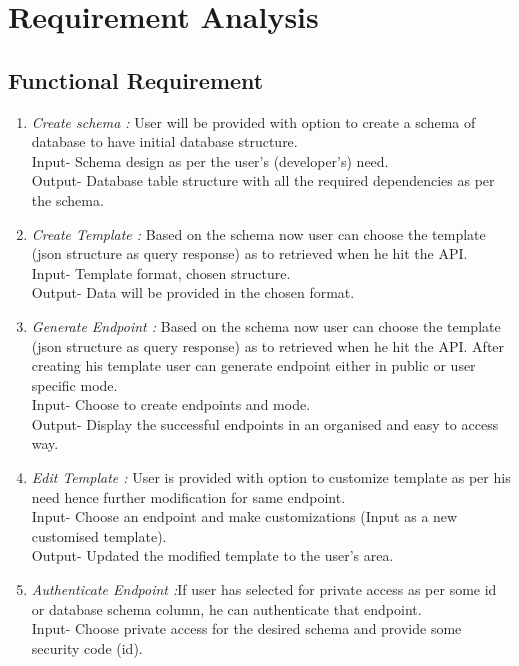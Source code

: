 \documentclass[a4paper,12pt]{report}
\begin{document}
    \vfill

    \section{Requirement Analysis}    
    \subsection{Functional Requirement}
    \begin{enumerate}
      \item {\emph {Create schema :} User will be provided with option to create a schema of database to have initial database structure. \\
      Input- Schema design as per the user’s (developer’s) need.  \\
      Output- Database table structure with all the required dependencies as per the schema.}
      \item {\emph {Create Template :} Based on the schema now user can choose the template (json structure as query response) as to retrieved when he hit the API. \\
        Input- Template format, chosen structure. \\
        Output- Data will be provided in the chosen format.
      }
      \item {\emph {Generate Endpoint :} Based on the schema now user can choose the template (json structure as query response) as to retrieved when he hit the API. After creating his template user can generate endpoint either in public or user specific mode.\\
        Input- Choose to create endpoints and mode. \\
        Output- Display the successful endpoints in an organised and easy to access way.
      }
      \item {\emph {Edit Template : } User is provided with option to customize template as per his need hence further modification for same endpoint.\\
        Input- Choose an endpoint and make customizations (Input as a new customised template).\\
        Output- Updated the modified template to the user’s area.
        }                        
      \item {\emph {Authenticate Endpoint :}If user has selected for private access as per some id or database schema column, he can authenticate that endpoint.\\
        Input- Choose private access for the desired schema and provide some security code (id).\\
}
\end{enumerate}
\end{document}
